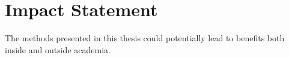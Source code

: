 \chapter{Impact Statement}

The methods presented in this thesis could potentially lead to benefits both inside and outside academia.
